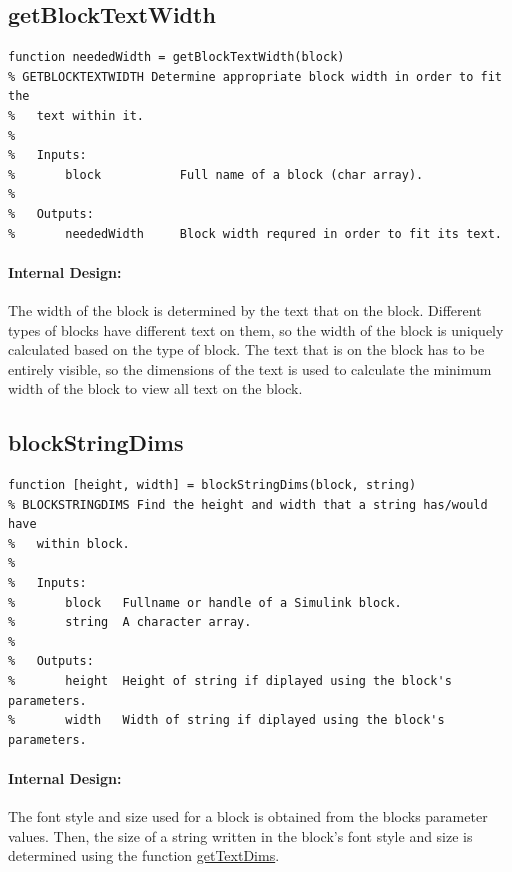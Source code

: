 \documentclass[12pt,letterpaper]{report}
\begin{document}
\subsection{getBlockTextWidth} \label{getBlockTextWidth}
\begin{lstlisting}
function neededWidth = getBlockTextWidth(block)
% GETBLOCKTEXTWIDTH Determine appropriate block width in order to fit the
%   text within it.
%
%   Inputs:
%       block           Full name of a block (char array).
%
%   Outputs:
%       neededWidth     Block width requred in order to fit its text.
\end{lstlisting}
\paragraph{Internal Design:} The width of the block is determined by the text that on the block. Different types of blocks have different text on them, so the width of the block is uniquely calculated based on the type of block. The text that is on the block has to be entirely visible, so the dimensions of the text is used to calculate the minimum width of the block to view all text on the block.

\subsection{blockStringDims} \label{blockStringDims}
\begin{lstlisting}
function [height, width] = blockStringDims(block, string)
% BLOCKSTRINGDIMS Find the height and width that a string has/would have
%   within block.
%
%   Inputs:
%       block   Fullname or handle of a Simulink block.
%       string  A character array.
%
%   Outputs:
%       height  Height of string if diplayed using the block's parameters.
%       width   Width of string if diplayed using the block's parameters.
\end{lstlisting}
\paragraph{Internal Design:} The font style and size used for a block is obtained from the blocks parameter values. Then, the size of a string written in the block's font style and size is determined using the function \hyperlink{getTextDims}{getTextDims}.
\end{document}
